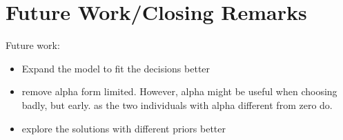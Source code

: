 \chapter{Future Work/Closing Remarks}

Future work:
\begin{itemize}
    \item Expand the model to fit the decisions better
    \item remove alpha form limited. However, alpha might be useful when choosing badly, but early. as the two individuals with alpha different from zero do. 
    \item explore the solutions with different priors better
\end{itemize}